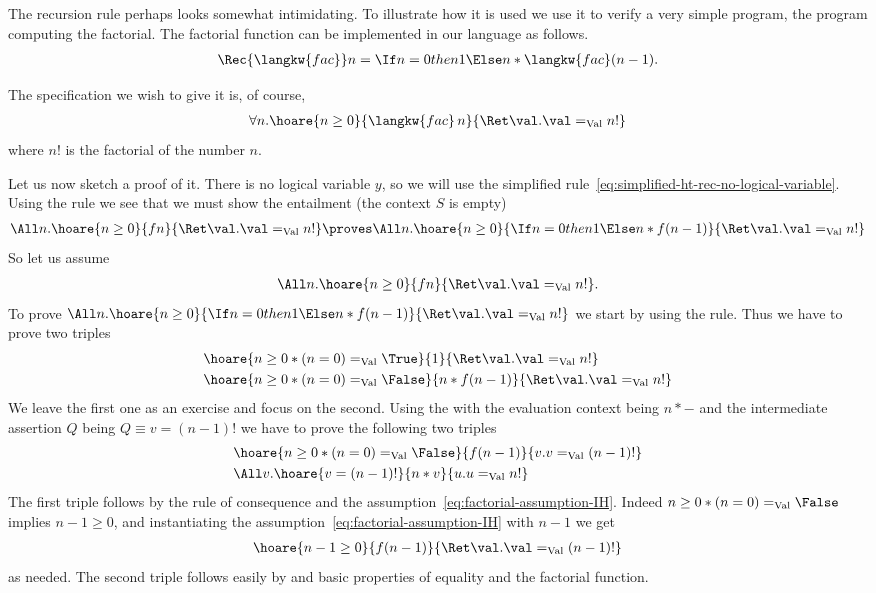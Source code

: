 \begin{example}
  The recursion rule perhaps looks somewhat intimidating.
  To illustrate how it is used we use it to verify a very simple program, the program computing the factorial.
  The factorial function can be implemented in our language as follows.
  \begin{align*}
    \Rec{\langkw{fac}} n = \If n = 0 then 1 \Else n * \langkw{fac}(n-1).
  \end{align*}
  
  The specification we wish to give it is, of course,
  \begin{align*}
    \forall n. \hoare{n \geq 0}{\langkw{fac} \, n}{\Ret\val. \val =_{\Val} n!}
  \end{align*}
  where $n!$ is the factorial of the number $n$.

  Let us now sketch a proof of it.
  There is no logical variable $y$, so we will use the simplified rule~\eqref{eq:simplified-ht-rec-no-logical-variable}.
  Using the rule we see that we must show the entailment (the context $S$ is empty)
  \begin{align*}
    \All n. \hoare{n \geq 0}{f n}{\Ret\val. \val =_{\Val} n!} \proves \All n. \hoare{n \geq 0}{\If n = 0 then 1 \Else n * f(n-1)}{\Ret\val. \val =_{\Val} n!}
  \end{align*}
  So let us assume
  \begin{align}
    \label{eq:factorial-assumption-IH}
    \All n.\hoare{n \geq 0}{f n}{\Ret\val.\val =_{\Val} n!}.
  \end{align}
  To prove $\All n.\hoare{n \geq 0}{\If n = 0 then 1 \Else n * f(n-1)}{\Ret\val.\val =_{\Val} n!}$ we start by using the  rule.
  Thus we have to prove two triples
  \begin{align*}
    &\hoare{n \geq 0 \ast (n = 0) =_{\Val} \True}{1}{\Ret\val.\val =_{\Val} n!}\\
    &\hoare{n \geq 0 \ast (n = 0) =_{\Val} \False}{n * f(n-1)}{\Ret\val.\val =_{\Val} n!}
  \end{align*}
  We leave the first one as an exercise and focus on the second.
  Using the  with the evaluation context being $n * -$ and the intermediate assertion $Q$ being $Q \equiv v = (n-1)!$ we have to prove the following two triples
  \begin{align*}
    &\hoare{n \geq 0 \ast (n = 0) =_{\Val} \False}{f (n - 1)}{v. v =_{\Val} (n-1)!}\\
    &\All v.\hoare{v = (n-1)!}{n * v}{u.u=_{\Val}n!}
  \end{align*}
  The first triple follows by the rule of consequence and the assumption~\eqref{eq:factorial-assumption-IH}.
  Indeed $n \geq 0 \ast (n = 0) =_{\Val} \False$ implies $n - 1 \geq 0$, and instantiating the assumption~\eqref{eq:factorial-assumption-IH} with $n-1$ we get
  \begin{align*}
    \hoare{n - 1 \geq 0}{f (n-1)}{\Ret\val.\val =_{\Val} (n-1)!}
  \end{align*}
  as needed.
  The second triple follows easily by  and basic properties of equality and the factorial function.
\end{example}

